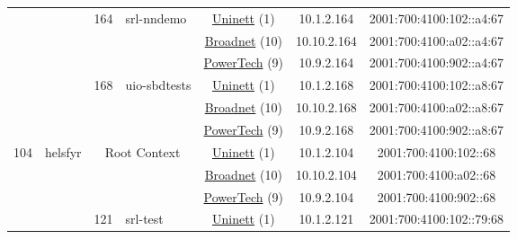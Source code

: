 \begin{small}
\begin{center}
\begin{longtable}{|c|c|c|c|c|c|c|c|}
  &  & \multirow{3}{*}{\tiny{164}} & \multicolumn{1}{|l|}{\multirow{3}{*}{\tiny{srl-nndemo}}} & \multicolumn{2}{|c|}{\tiny{\href{https://www.uninett.no}{Uninett} (1)}} & \tiny{10.1.2.164} & \tiny{2001:700:4100:102::a4:67} \\* \cline{5-5}\cline{6-6}\cline{7-7}\cline{8-8}
  &  &  &  & \multicolumn{2}{|c|}{\tiny{\href{https://www.broadnet.no}{Broadnet} (10)}} & \tiny{10.10.2.164} & \tiny{2001:700:4100:a02::a4:67} \\* \cline{5-5}\cline{6-6}\cline{7-7}\cline{8-8}
  &  &  &  & \multicolumn{2}{|c|}{\tiny{\href{http://www.powertech.no}{PowerTech} (9)}} & \tiny{10.9.2.164} & \tiny{2001:700:4100:902::a4:67} \\* \cline{3-3}\cline{4-4}\cline{5-5}\cline{6-6}\cline{7-7}\cline{8-8}
  &  & \multirow{3}{*}{\tiny{168}} & \multicolumn{1}{|l|}{\multirow{3}{*}{\tiny{uio-sbdtests}}} & \multicolumn{2}{|c|}{\tiny{\href{https://www.uninett.no}{Uninett} (1)}} & \tiny{10.1.2.168} & \tiny{2001:700:4100:102::a8:67} \\* \cline{5-5}\cline{6-6}\cline{7-7}\cline{8-8}
  &  &  &  & \multicolumn{2}{|c|}{\tiny{\href{https://www.broadnet.no}{Broadnet} (10)}} & \tiny{10.10.2.168} & \tiny{2001:700:4100:a02::a8:67} \\* \cline{5-5}\cline{6-6}\cline{7-7}\cline{8-8}
  &  &  &  & \multicolumn{2}{|c|}{\tiny{\href{http://www.powertech.no}{PowerTech} (9)}} & \tiny{10.9.2.168} & \tiny{2001:700:4100:902::a8:67} \\ \hline
 \multirow{24}{*}{\tiny{104}} & \multicolumn{1}{|l|}{\multirow{24}{*}{\tiny{helsfyr}}} & \multicolumn{2}{|c|}{\multirow{3}{*}{\tiny{Root Context}}} & \multicolumn{2}{|c|}{\tiny{\href{https://www.uninett.no}{Uninett} (1)}} & \tiny{10.1.2.104} & \tiny{2001:700:4100:102::68} \\* \cline{5-5}\cline{6-6}\cline{7-7}\cline{8-8}
  &  & \multicolumn{2}{|c|}{} & \multicolumn{2}{|c|}{\tiny{\href{https://www.broadnet.no}{Broadnet} (10)}} & \tiny{10.10.2.104} & \tiny{2001:700:4100:a02::68} \\* \cline{5-5}\cline{6-6}\cline{7-7}\cline{8-8}
  &  & \multicolumn{2}{|c|}{} & \multicolumn{2}{|c|}{\tiny{\href{http://www.powertech.no}{PowerTech} (9)}} & \tiny{10.9.2.104} & \tiny{2001:700:4100:902::68} \\* \cline{3-3}\cline{4-4}\cline{5-5}\cline{6-6}\cline{7-7}\cline{8-8}
  &  & \multirow{3}{*}{\tiny{121}} & \multicolumn{1}{|l|}{\multirow{3}{*}{\tiny{srl-test}}} & \multicolumn{2}{|c|}{\tiny{\href{https://www.uninett.no}{Uninett} (1)}} & \tiny{10.1.2.121} & \tiny{2001:700:4100:102::79:68} \\* \cline{5-5}\cline{6-6}\cline{7-7}\cline{8-8}

\end{longtable}
\end{center}
\end{small}
